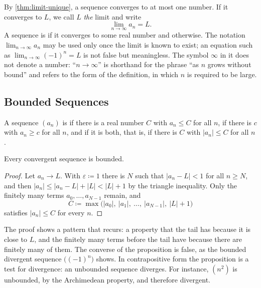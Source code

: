 By \cref{thm:limit-unique}, a sequence converges to at most one number. If it converges to $L$, we call $L$ \emph{the} limit and write
\[
\lim_{n\to\infty}a_n=L .
\]
A sequence is  if it converges to some real number and  otherwise. The notation $\lim_{n\to\infty}a_n$ may be used only once the limit is known to exist; an equation such as $\lim_{n\to\infty}(-1)^n=L$ is not false but meaningless. The symbol $\infty$ in it does not denote a number: ``$n\to\infty$'' is shorthand for the phrase ``as $n$ grows without bound'' and refers to the form of the definition, in which $n$ is required to be large.

\subsection{Bounded Sequences}

\begin{definition}
\label{def:bounded-seq}
A sequence $(a_n)$ is  if there is a real number $C$ with $a_n\le C$ for all $n$,  if there is $c$ with $a_n\ge c$ for all $n$, and  if it is both, that is, if there is $C$ with $|a_n|\le C$ for all $n$.
\end{definition}

\begin{proposition}
\label{prop:convergent-bounded}
Every convergent sequence is bounded.
\end{proposition}

\begin{proof}
Let $a_n\to L$. With $\varepsilon\coloneqq1$ there is $N$ such that $|a_n-L|<1$ for all $n\ge N$, and then $|a_n|\le|a_n-L|+|L|<|L|+1$ by the triangle inequality. Only the finitely many terms $a_0,\ldots,a_{N-1}$ remain, and
\[
C\coloneqq\max\bigl(|a_0|,\ |a_1|,\ \ldots,\ |a_{N-1}|,\ |L|+1\bigr)
\]
satisfies $|a_n|\le C$ for every $n$.
\end{proof}

The proof shows a pattern that recurs: a property that the tail has because it is close to $L$, and the finitely many terms before the tail have because there are finitely many of them. The converse of the proposition is false, as the bounded divergent sequence $\bigl((-1)^n\bigr)$ shows. In contrapositive form the proposition is a test for divergence: an unbounded sequence diverges. For instance, $(n^2)$ is unbounded, by the Archimedean property, and therefore divergent.


